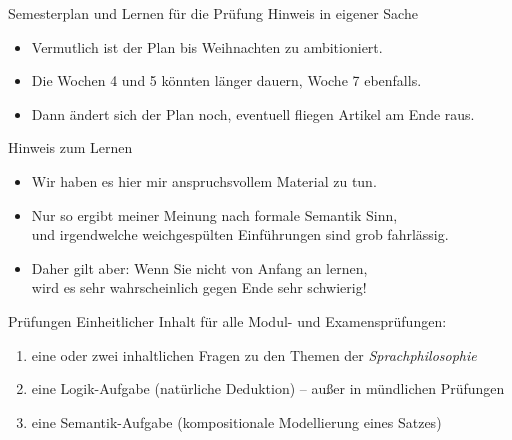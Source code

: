 \begin{frame}
  {Semesterplan und Lernen für die Prüfung}
  \onslide<+->
  \onslide<+->
  \centering 
  \alert{\large Hinweis in eigener Sache}\\
  \Halbzeile
  \begin{itemize}[<+->]
    \item Vermutlich ist der Plan bis Weihnachten zu ambitioniert.
    \item Die Wochen 4 und 5 könnten länger dauern, Woche 7 ebenfalls.
    \item Dann ändert sich der Plan noch, eventuell fliegen Artikel am Ende raus.
  \end{itemize}
  \Zeile
  \onslide<+->
  \alert{\large Hinweis zum Lernen}\\
  \Halbzeile
  \begin{itemize}[<+->]
    \item Wir haben es hier mir anspruchsvollem Material zu tun.
    \item Nur so ergibt meiner Meinung nach formale Semantik Sinn,\\
      und irgendwelche weichgespülten Einführungen sind grob fahrlässig.
    \item Daher gilt aber: Wenn Sie nicht von Anfang an lernen,\\
      wird es sehr wahrscheinlich gegen Ende sehr schwierig!
  \end{itemize}
\end{frame}

\begin{frame}
  {Prüfungen}
  \onslide<+->
  \onslide<+->
  Einheitlicher Inhalt für alle Modul- und Examensprüfungen:\\
  \Zeile
  \begin{enumerate}[<+->]
    \item eine oder zwei inhaltlichen Fragen zu den Themen der \textit{Sprachphilosophie}\\
    \item eine Logik-Aufgabe (natürliche Deduktion) -- \alert{außer in mündlichen Prüfungen}
    \item eine Semantik-Aufgabe (kompositionale Modellierung eines Satzes)
  \end{enumerate}
  \Zeile
  \onslide<+->
\end{frame}


